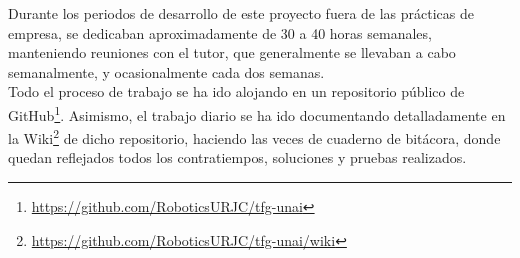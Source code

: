 Durante los periodos de desarrollo de este proyecto fuera de las prácticas de
empresa, se dedicaban aproximadamente de 30 a 40 horas semanales, manteniendo
reuniones con el tutor, que generalmente se llevaban a cabo semanalmente, y
ocasionalmente cada dos semanas.
\\

Todo el proceso de trabajo se ha ido alojando en un repositorio público de
GitHub\footnote{\url{https://github.com/RoboticsURJC/tfg-unai}}.
Asimismo, el trabajo diario se ha ido documentando detalladamente en la
Wiki\footnote{\url{https://github.com/RoboticsURJC/tfg-unai/wiki}} de dicho
repositorio, haciendo las veces de cuaderno de bitácora, donde quedan reflejados
todos los contratiempos, soluciones y pruebas realizados.

